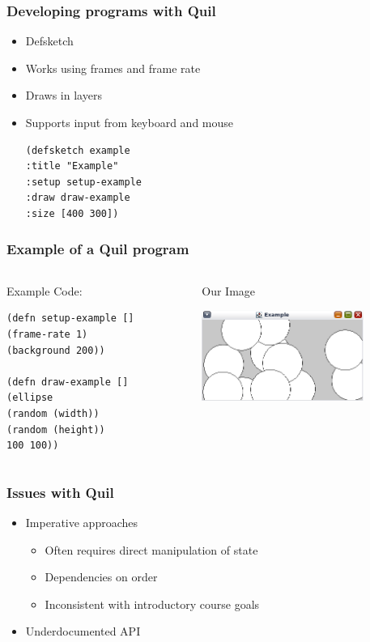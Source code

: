 \documentclass{beamer}
\begin{document}
\begin{frame}[fragile]
\frametitle{Developing programs with Quil}
\begin{itemize}
\item Defsketch
\item Works using frames and frame rate
\item Draws in layers
\item Supports input from keyboard and mouse
\begin{verbatim}
(defsketch example 
:title "Example"
:setup setup-example
:draw draw-example
:size [400 300])
\end{verbatim}
\end{itemize}
\end{frame}

\begin{frame}[fragile]
\frametitle{Example of a Quil program}
  \begin{columns}[T]
    \begin{column}{.5\textwidth}
      \begin{block}{Example Code:}
        \begin{verbatim}
(defn setup-example []
(frame-rate 1)
(background 200))

(defn draw-example []
(ellipse
(random (width))
(random (height))
100 100))
        \end{verbatim}
      \end{block}
    \end{column}

    \begin{column}{.5\textwidth}
      \begin{block}{Our Image}
        \begin{center}
        \includegraphics[width=150pt]{quil-example}
        \end{center}
      \end{block}
    \end{column}
  \end{columns}

\end{frame}

\begin{frame}
\frametitle{Issues with Quil}
\begin{itemize}
\item Imperative approaches
	\begin{itemize}
		\item Often requires direct manipulation of state
		\item Dependencies on order
		\item Inconsistent with introductory course goals
	\end{itemize}
\item Underdocumented API
\end{itemize}
\end{frame}
\end{document}
